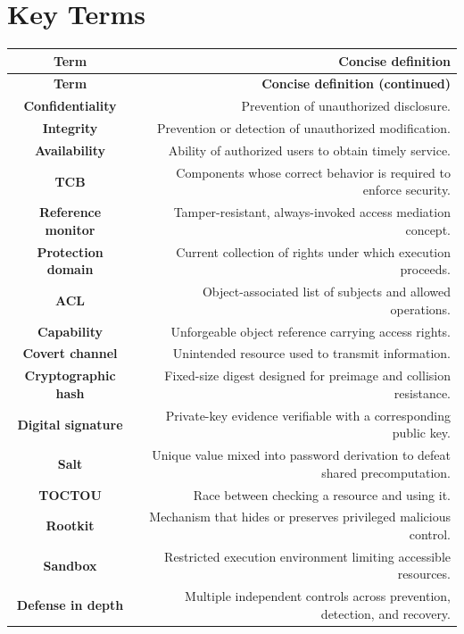 \documentclass[10pt,letterpaper]{article}
\begin{document}
\section*{Key Terms}
\small
\begin{longtable}{C N}
\color{white}\textbf{Term} & \color{white}\textbf{Concise definition}\\
\endfirsthead
{}\color{white}\textbf{Term} & \color{white}\textbf{Concise definition (continued)}\\
\endhead
\textbf{Confidentiality} & Prevention of unauthorized disclosure.\\\hline
\textbf{Integrity} & Prevention or detection of unauthorized modification.\\\hline
\textbf{Availability} & Ability of authorized users to obtain timely service.\\\hline
\textbf{TCB} & Components whose correct behavior is required to enforce security.\\\hline
\textbf{Reference monitor} & Tamper-resistant, always-invoked access mediation concept.\\\hline
\textbf{Protection domain} & Current collection of rights under which execution proceeds.\\\hline
\textbf{ACL} & Object-associated list of subjects and allowed operations.\\\hline
\textbf{Capability} & Unforgeable object reference carrying access rights.\\\hline
\textbf{Covert channel} & Unintended resource used to transmit information.\\\hline
\textbf{Cryptographic hash} & Fixed-size digest designed for preimage and collision resistance.\\\hline
\textbf{Digital signature} & Private-key evidence verifiable with a corresponding public key.\\\hline
\textbf{Salt} & Unique value mixed into password derivation to defeat shared precomputation.\\\hline
\textbf{TOCTOU} & Race between checking a resource and using it.\\\hline
\textbf{Rootkit} & Mechanism that hides or preserves privileged malicious control.\\\hline
\textbf{Sandbox} & Restricted execution environment limiting accessible resources.\\\hline
\textbf{Defense in depth} & Multiple independent controls across prevention, detection, and recovery.\\\hline
\end{longtable}
\normalsize
\end{document}
